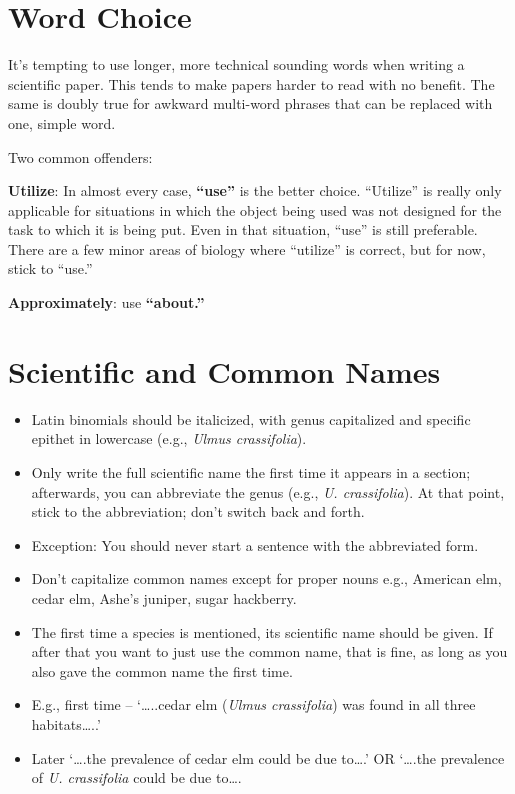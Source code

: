 \documentclass[]{book}
\providecommand{\tightlist}{%
  \setlength{\itemsep}{0pt}\setlength{\parskip}{0pt}}
\begin{document}
\section{Word Choice}\label{word-choice}

It's tempting to use longer, more technical sounding words when writing
a scientific paper. This tends to make papers harder to read with no
benefit. The same is doubly true for awkward multi-word phrases that can
be replaced with one, simple word.

Two common offenders:

\textbf{Utilize}: In almost every case, \textbf{``use''} is the better
choice. ``Utilize'' is really only applicable for situations in which
the object being used was not designed for the task to which it is being
put. Even in that situation, ``use'' is still preferable. There are a
few minor areas of biology where ``utilize'' is correct, but for now,
stick to ``use.''

\textbf{Approximately}: use \textbf{``about.''}

\section{Scientific and Common Names}\label{scientific-and-common-names}

\begin{itemize}
\tightlist
\item
  Latin binomials should be italicized, with genus capitalized and
  specific epithet in lowercase (e.g., \emph{Ulmus crassifolia}).\\
\item
  Only write the full scientific name the first time it appears in a
  section; afterwards, you can abbreviate the genus (e.g., \emph{U.
  crassifolia}). At that point, stick to the abbreviation; don't switch
  back and forth.
\item
  Exception: You should never start a sentence with the abbreviated
  form.
\item
  Don't capitalize common names except for proper nouns e.g., American
  elm, cedar elm, Ashe's juniper, sugar hackberry.\\
\item
  The first time a species is mentioned, its scientific name should be
  given. If after that you want to just use the common name, that is
  fine, as long as you also gave the common name the first time.\\
\item
  E.g., first time -- `\ldots{}..cedar elm (\emph{Ulmus crassifolia})
  was found in all three habitats\ldots{}..'
\item
  Later `\ldots{}.the prevalence of cedar elm could be due to\ldots{}.'
  OR `\ldots{}.the prevalence of \emph{U. crassifolia} could be due
  to\ldots{}.
\end{itemize}
\end{document}
